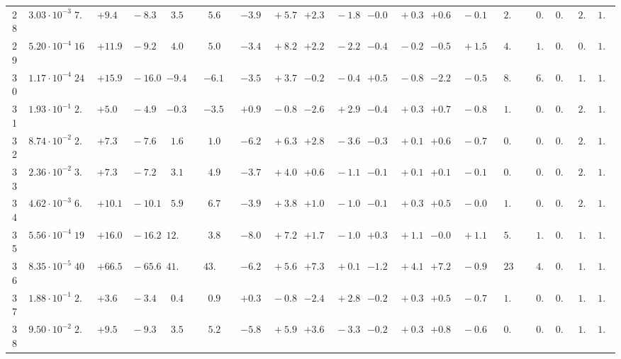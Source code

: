 \documentclass[12pt]{article}
\begin{document}
\begin{table}
\begin{tabular}{ccrr@{\hskip0pt}rrc@{\hskip0pt}r@{\hskip0pt}c@{\hskip0pt}r@{\hskip0pt}rr@{\hskip0pt}rr@{\hskip0pt}rr@{\hskip0pt}rr@{\hskip0pt}r@{\hskip0pt}r@{\hskip0pt}c|rr|r}
28 &$3.03 \cdot 10^{-3}$ &$ 7.7$  & ${+9.4~}$&${~-8.3}$ & $ 3.5$  & &$ 5.6$&&${-3.9~}$&${~+5.7}$ & ${+2.3~}$&${~-1.8}$ & ${-0.0~}$&${~+0.3}$ & ${+0.6~}$&${~-0.1}$ & &$ 2.1$&&$ 0.7$  & $0.95$  & $ 2.1$  & $1.03$   \\ 
29 &$5.20 \cdot 10^{-4}$ &$16.0$  & ${+11.9~}$&${~-9.2}$ & $ 4.0$  & &$ 5.0$&&${-3.4~}$&${~+8.2}$ & ${+2.2~}$&${~-2.2}$ & ${-0.4~}$&${~-0.2}$ & ${-0.5~}$&${~+1.5}$ & &$ 4.8$&&$ 1.8$  & $0.96$  & $ 0.9$  & $1.01$   \\ 
30 &$1.17 \cdot 10^{-4}$ &$24.9$  & ${+15.9~}$&${~-16.0}$ & $-9.4$  & &$-6.1$&&${-3.5~}$&${~+3.7}$ & ${-0.2~}$&${~-0.4}$ & ${+0.5~}$&${~-0.8}$ & ${-2.2~}$&${~-0.5}$ & &$ 8.5$&&$ 6.2$  & $0.95$  & $ 1.4$  & $1.00$   \\ 
31 &$1.93 \cdot 10^{-1}$ &$ 2.5$  & ${+5.0~}$&${~-4.9}$ & $-0.3$  & &$-3.5$&&${+0.9~}$&${~-0.8}$ & ${-2.6~}$&${~+2.9}$ & ${-0.4~}$&${~+0.3}$ & ${+0.7~}$&${~-0.8}$ & &$ 1.0$&&$ 0.3$  & $0.89$  & $ 2.6$  & $1.03$   \\ 
32 &$8.74 \cdot 10^{-2}$ &$ 2.3$  & ${+7.3~}$&${~-7.6}$ & $ 1.6$  & &$ 1.0$&&${-6.2~}$&${~+6.3}$ & ${+2.8~}$&${~-3.6}$ & ${-0.3~}$&${~+0.1}$ & ${+0.6~}$&${~-0.7}$ & &$ 0.8$&&$ 0.1$  & $0.94$  & $ 2.3$  & $1.02$   \\ 
33 &$2.36 \cdot 10^{-2}$ &$ 3.1$  & ${+7.3~}$&${~-7.2}$ & $ 3.1$  & &$ 4.9$&&${-3.7~}$&${~+4.0}$ & ${+0.6~}$&${~-1.1}$ & ${-0.1~}$&${~+0.1}$ & ${+0.1~}$&${~-0.1}$ & &$ 0.8$&&$ 0.4$  & $0.95$  & $ 2.3$  & $1.02$   \\ 
34 &$4.62 \cdot 10^{-3}$ &$ 6.3$  & ${+10.1~}$&${~-10.1}$ & $ 5.9$  & &$ 6.7$&&${-3.9~}$&${~+3.8}$ & ${+1.0~}$&${~-1.0}$ & ${-0.1~}$&${~+0.3}$ & ${+0.5~}$&${~-0.0}$ & &$ 1.6$&&$ 0.9$  & $0.95$  & $ 2.0$  & $1.03$   \\ 
35 &$5.56 \cdot 10^{-4}$ &$19.6$  & ${+16.0~}$&${~-16.2}$ & $12.4$  & &$ 3.8$&&${-8.0~}$&${~+7.2}$ & ${+1.7~}$&${~-1.0}$ & ${+0.3~}$&${~+1.1}$ & ${-0.0~}$&${~+1.1}$ & &$ 5.1$&&$ 1.7$  & $0.96$  & $ 1.3$  & $1.02$   \\ 
36 &$8.35 \cdot 10^{-5}$ &$40.1$  & ${+66.5~}$&${~-65.6}$ & $41.7$  & &$43.9$&&${-6.2~}$&${~+5.6}$ & ${+7.3~}$&${~+0.1}$ & ${-1.2~}$&${~+4.1}$ & ${+7.2~}$&${~-0.9}$ & &$23.9$&&$ 4.5$  & $0.95$  & $ 1.2$  & $1.07$   \\ 
37 &$1.88 \cdot 10^{-1}$ &$ 2.9$  & ${+3.6~}$&${~-3.4}$ & $ 0.4$  & &$ 0.9$&&${+0.3~}$&${~-0.8}$ & ${-2.4~}$&${~+2.8}$ & ${-0.2~}$&${~+0.3}$ & ${+0.5~}$&${~-0.7}$ & &$ 1.2$&&$ 0.4$  & $0.89$  & $ 1.9$  & $1.03$   \\ 
38 &$9.50 \cdot 10^{-2}$ &$ 2.4$  & ${+9.5~}$&${~-9.3}$ & $ 3.5$  & &$ 5.2$&&${-5.8~}$&${~+5.9}$ & ${+3.6~}$&${~-3.3}$ & ${-0.2~}$&${~+0.3}$ & ${+0.8~}$&${~-0.6}$ & &$ 0.8$&&$ 0.1$  & $0.94$  & $ 1.8$  & $1.02$   \\ 

\end{tabular}
\end{table}
\end{document}
